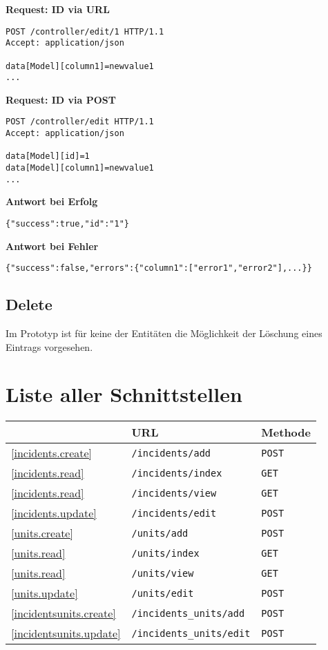 \documentclass[a4paper,11pt]{article}
\newenvironment{code}[1][]{\smallskip\noindent\textbf{#1}}{}
\begin{document}
\begin{code}[Request: ID via URL]
\begin{lstlisting}
POST /controller/edit/1 HTTP/1.1
Accept: application/json

data[Model][column1]=newvalue1
...
\end{lstlisting}
\end{code}
\begin{code}[Request: ID via POST]
\begin{lstlisting}
POST /controller/edit HTTP/1.1
Accept: application/json

data[Model][id]=1
data[Model][column1]=newvalue1
...
\end{lstlisting}
\end{code}
\begin{code}[Antwort bei Erfolg]
\begin{lstlisting}
{"success":true,"id":"1"}
\end{lstlisting}
\end{code}
\begin{code}[Antwort bei Fehler]
\begin{lstlisting}
{"success":false,"errors":{"column1":["error1","error2"],...}}
\end{lstlisting}
\end{code}

\subsection{Delete}

Im Prototyp ist für keine der Entitäten die Möglichkeit der Löschung eines Eintrags vorgesehen.

\section{Liste aller Schnittstellen}

\begin{tabular}{lll}
& URL & Methode \\
\hline
\ref{incidents.create} & \texttt{/incidents/add}   & \texttt{POST} \\
\ref{incidents.read}   & \texttt{/incidents/index} & \texttt{GET} \\
\ref{incidents.read}   & \texttt{/incidents/view}  & \texttt{GET} \\
\ref{incidents.update} & \texttt{/incidents/edit}  & \texttt{POST} \\
\hline
\ref{units.create} & \texttt{/units/add}   & \texttt{POST} \\
\ref{units.read}   & \texttt{/units/index} & \texttt{GET} \\
\ref{units.read}   & \texttt{/units/view}  & \texttt{GET} \\
\ref{units.update} & \texttt{/units/edit}  & \texttt{POST} \\
\hline
\ref{incidentsunits.create} & \texttt{/incidents\_units/add}   & \texttt{POST} \\
\ref{incidentsunits.update} & \texttt{/incidents\_units/edit}  & \texttt{POST} \\
\end{tabular}
\end{document}

